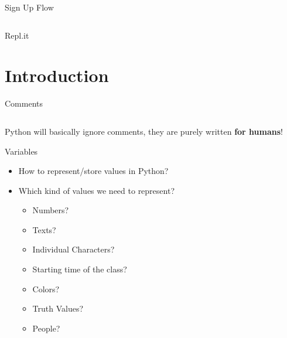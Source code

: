\begin{frame}{Sign Up Flow}
\begin{columns}
\begin{column}{0.33\textwidth}
			\end{column}
		\end{columns}	
		\end{frame}

		\begin{frame}{Repl.it}
		\end{frame}

	\section{Introduction}
		
		\begin{frame}{Comments}
			\LARGE
			\inputminted[frame=single,framesep=2pt]{python3}{code-examples/comments.py}
			Python will basically ignore comments, they are purely written \textbf{for humans}!
		\end{frame}

		\begin{frame}{Variables}
			\LARGE
			\begin{itemize}
				\item How to represent/store values in Python?
				\pause
				\item Which kind of values we need to represent?
				\pause
					\begin{itemize}
						\Large
						\item Numbers?
						\pause
						\item Texts?
						\pause
						\item Individual Characters?
						\pause
						\item Starting time of the class?
						\pause
						\item Colors?
						\pause
						\item Truth Values?
						\pause
						\item People?
					\end{itemize} 
			\end{itemize}
		\end{frame}

